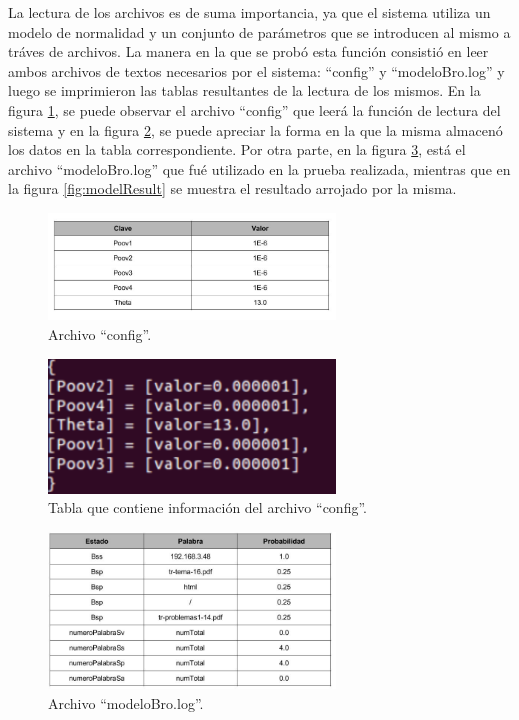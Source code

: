 La lectura de los archivos es de suma importancia, ya que el sistema utiliza un modelo de normalidad y un conjunto de parámetros que se introducen
al mismo a tráves de archivos.
La manera en la que se probó esta función consistió en leer ambos archivos de textos necesarios por el sistema: ``config'' y ``modeloBro.log'' y luego se imprimieron las tablas resultantes de la lectura de los mismos.
En la figura \ref{fig:configFile}, se puede observar el archivo ``config'' que leerá la función de lectura del sistema y en la figura \ref{fig:configResult}, se puede apreciar la forma en la
que la misma almacenó los datos en la tabla correspondiente.
Por otra parte, en la figura \ref{fig:modelFile}, está el archivo ``modeloBro.log'' que fué utilizado en la prueba realizada, mientras que en la figura \ref{fig:modelResult} se muestra el resultado arrojado por la misma.

\begin{figure}[!htb]
\begin{center}
\includegraphics[width=3in]{./img/configFile.jpg}
\caption{Archivo ``config''.}
\label{fig:configFile}
\end{center}
\end{figure}

\begin{figure}[!htb]
\begin{center}
\includegraphics[width=3in]{./img/tablaConfig.png}
\caption{Tabla que contiene información del archivo ``config''.}
\label{fig:configResult}
\end{center}
\end{figure}

\begin{figure}[!htb]
\begin{center}
\includegraphics[width=3in]{./img/modeloOffline.jpg}
\caption{Archivo ``modeloBro.log''.}
\label{fig:modelFile}
\end{center}
\end{figure}

